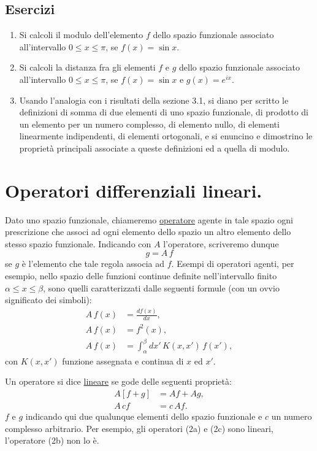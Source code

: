 \documentclass[11pt, a4paper]{book}
\numberwithin{equation}{section}
\newenvironment{esercizi}{\subsection*{Esercizi}\begin{enumerate}}{\end{enumerate}}
\begin{document}
\begin{esercizi}
\item Si calcoli il modulo dell'elemento $f$ dello spazio funzionale
associato all'intervallo $0 \leq x \leq \pi$, se $f(x) = \sin x$.

\item Si calcoli la distanza fra gli elementi $f$ e $g$ dello spazio
funzionale associato all'intervallo $0 \leq x \leq \pi$, se $f(x) =
\sin x$ e $g(x) = e^{ix}$.

\item Usando l'analogia con i risultati della sezione 3.1, si diano per
scritto le definizioni di somma di due elementi di uno spazio
funzionale, di prodotto di un elemento per un numero complesso, di
elemento nullo, di elementi linearmente indipendenti, di elementi
ortogonali, e si enuncino e dimostrino le proprietà principali associate
a queste definizioni ed a quella di modulo.

\end{esercizi}

\section{Operatori differenziali lineari.}

Dato uno spazio funzionale, chiameremo \uline{operatore} agente in
tale spazio ogni prescrizione che associ ad ogni elemento dello spazio
un altro elemento dello stesso spazio funzionale. Indicando con $A$
l'operatore, scriveremo dunque
\begin{equation}
g = A\,f
\end{equation}
se $g$ è l'elemento che tale regola associa ad $f$. Esempi di operatori
agenti, per esempio, nello spazio delle funzioni continue definite
nell'intervallo finito $\alpha \leq x \leq \beta$, sono quelli
caratterizzati dalle seguenti formule (con un ovvio significato dei
simboli):
\begin{align}
A\,f(x) &= \frac{df(x)}{dx}, \tag{2a} \\
A\,f(x) &= f^2(x), \tag{2b} \\
A\,f(x) &= \int_\alpha^\beta dx'\,K(x,x')\,f(x'), \tag{2c}
\end{align}
con $K(x,x')$ funzione assegnata e continua di $x$ ed $x'$.

Un operatore si dice \uline{lineare} se gode delle seguenti
proprietà:
\begin{align}
A[f+g] &= Af + Ag, \tag{3a} \\
A\,cf  &= c\,Af.   \tag{3b}
\end{align}
$f$ e $g$ indicando qui due qualunque elementi dello spazio funzionale
e $c$ un numero complesso arbitrario. Per esempio, gli operatori (2a) e
(2c) sono lineari, l'operatore (2b) non lo è.
\end{document}
